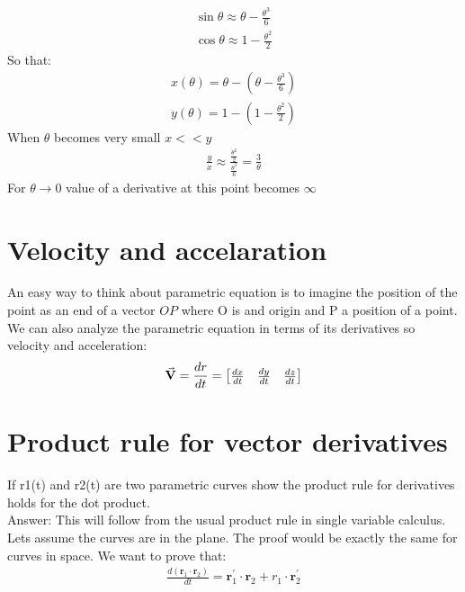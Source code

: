 \documentclass[11pt]{article}
\begin{document}
    \begin{gather*}
        \sin{\theta} \approx \theta - \frac{\theta^3 }{6}\\
        \cos{\theta} \approx 1 - \frac{\theta^2}{2}
    \end{gather*}
    So that:
    \begin{gather*}
        x(\theta) = \theta - (\theta - \frac{\theta^3}{6}) \\
        y(\theta) = 1 - (1 - \frac{\theta^2}{2})
    \end{gather*}
    When $\theta$ becomes very small $x << y$\\
    \begin{gather*}
        \frac{y}{x} \approx \frac{\frac{\theta^2}{2}}{\frac{\theta^3}{6}}
        = \frac{3}{\theta}
    \end{gather*}
    For $\theta \rightarrow 0$ value of a derivative at this point becomes $\infty$

    \section{Velocity and accelaration}
    An easy way to think about parametric equation is to imagine the position of the point as an end of a vector $OP$ where O is and origin and P a position of a point.\\
    We can also analyze the parametric equation in terms of its derivatives so velocity and acceleration:
    \begin{gather*}
        \va{V} = \frac{dr}{dt} = \bmqty{\frac{dx}{dt} & \frac{dy}{dt} & \frac{dz}{dt}}
    \end{gather*}

    \section{Product rule for vector derivatives}
    If r1(t) and r2(t) are two parametric curves show the product rule for derivatives holds for the dot product.\\
    Answer: This will follow from the usual product rule in single variable calculus. Lets assume the curves are in the plane. The proof would be exactly the same for curves in space. We want to prove that:
    \begin{gather*}
        \frac { d \left( \mathbf { r } _ { 1 } \cdot \mathbf { r } _ { 2 } \right) } { d t } = \mathbf { r } _ { 1 } ^ { \prime } \cdot \mathbf { r } _ { 2 } + r _ { 1 } \cdot \mathbf { r } _ { 2 } ^ { \prime }
    \end{gather*}
\end{document}
